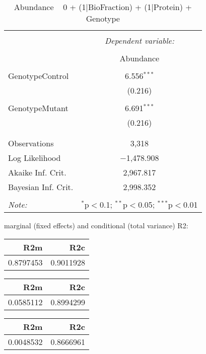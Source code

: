 \documentclass[11pt]{report}
\begin{document}
\begin{table}[!htbp] \centering 
  \caption{Abundance ~ 0 + (1|BioFraction) + (1|Protein) + Genotype} 
  \label{} 
\begin{tabular}{@{\extracolsep{5pt}}lc} 
\\[-1.8ex]\hline 
\hline \\[-1.8ex] 
 & \multicolumn{1}{c}{\textit{Dependent variable:}} \\ 
\cline{2-2} 
\\[-1.8ex] & Abundance \\ 
\hline \\[-1.8ex] 
 GenotypeControl & 6.556$^{***}$ \\ 
  & (0.216) \\ 
  & \\ 
 GenotypeMutant & 6.691$^{***}$ \\ 
  & (0.216) \\ 
  & \\ 
\hline \\[-1.8ex] 
Observations & 3,318 \\ 
Log Likelihood & $-$1,478.908 \\ 
Akaike Inf. Crit. & 2,967.817 \\ 
Bayesian Inf. Crit. & 2,998.352 \\ 
\hline 
\hline \\[-1.8ex] 
\textit{Note:}  & \multicolumn{1}{r}{$^{*}$p$<$0.1; $^{**}$p$<$0.05; $^{***}$p$<$0.01} \\ 
\end{tabular} 
\end{table} 
marginal (fixed effects) and conditional (total variance) R2:

\begin{tabular}{r|r}
\hline
R2m & R2c\\
\hline
0.8797453 & 0.9011928\\
\hline
\end{tabular}

\begin{tabular}{r|r}
\hline
R2m & R2c\\
\hline
0.0585112 & 0.8994299\\
\hline
\end{tabular}

\begin{tabular}{r|r}
\hline
R2m & R2c\\
\hline
0.0048532 & 0.8666961\\
\hline
\end{tabular}
\end{document}
